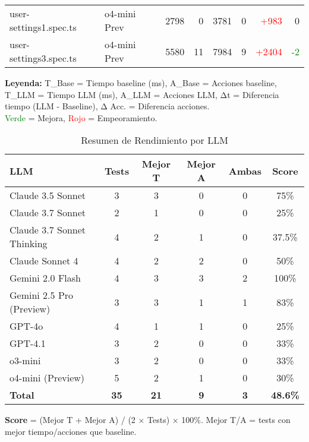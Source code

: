 \begin{table}[htbp]
\begin{tabular}{|p{3.5cm}|p{2.5cm}|r|r|r|r|r|r|}
user-settings1.spec.ts & o4-mini Prev & 2798 & 0 & 3781 & 0 & \textcolor{red}{+983} & 0 \\
user-settings3.spec.ts & o4-mini Prev & 5580 & 11 & 7984 & 9 & \textcolor{red}{+2404} & \textcolor{green}{-2} \\
\hline
\end{tabular}
\begin{flushleft}
\footnotesize
\textbf{Leyenda:} T\_Base = Tiempo baseline (ms), A\_Base = Acciones baseline, T\_LLM = Tiempo LLM (ms), A\_LLM = Acciones LLM, Δt = Diferencia tiempo (LLM - Baseline), Δ Acc. = Diferencia acciones. \\
\textcolor{green}{Verde} = Mejora, \textcolor{red}{Rojo} = Empeoramiento.
\end{flushleft}
\end{table}

\begin{table}[htbp]
\centering
\caption{Resumen de Rendimiento por LLM}
\label{tab:performance_summary}
\footnotesize
\begin{tabular}{|l|c|c|c|c|c|}
\hline
\textbf{LLM} & \textbf{Tests} & \textbf{Mejor T} & \textbf{Mejor A} & \textbf{Ambas} & \textbf{Score} \\
\hline
Claude 3.5 Sonnet & 3 & 3 & 0 & 0 & 75\% \\
Claude 3.7 Sonnet & 2 & 1 & 0 & 0 & 25\% \\
Claude 3.7 Sonnet Thinking & 4 & 2 & 1 & 0 & 37.5\% \\
Claude Sonnet 4 & 4 & 2 & 2 & 0 & 50\% \\
Gemini 2.0 Flash & 4 & 3 & 3 & 2 & 100\% \\
Gemini 2.5 Pro (Preview) & 3 & 3 & 1 & 1 & 83\% \\
GPT-4o & 4 & 1 & 1 & 0 & 25\% \\
GPT-4.1 & 3 & 2 & 0 & 0 & 33\% \\
o3-mini & 3 & 2 & 0 & 0 & 33\% \\
o4-mini (Preview) & 5 & 2 & 1 & 0 & 30\% \\
\hline
\textbf{Total} & \textbf{35} & \textbf{21} & \textbf{9} & \textbf{3} & \textbf{48.6\%} \\
\hline
\end{tabular}
\begin{flushleft}
\footnotesize
\textbf{Score} = (Mejor T + Mejor A) / (2 × Tests) × 100\%. Mejor T/A = tests con mejor tiempo/acciones que baseline.
\end{flushleft}
\end{table}
